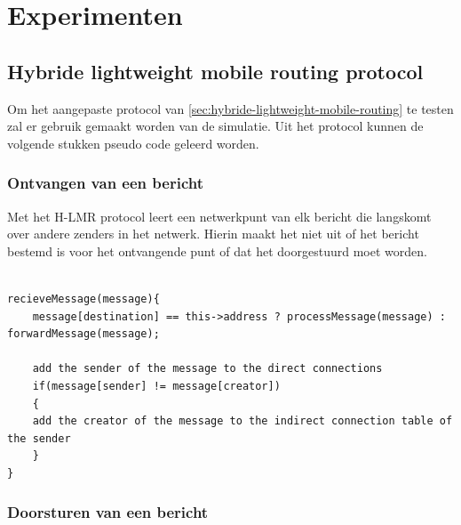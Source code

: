 \documentclass[a4paper, 11pt, oneside]{report}
\begin{document}
\chapter{Experimenten}
\label{experimenten}


\section[Hybride-LMR]{Hybride lightweight mobile routing protocol}

Om het aangepaste protocol van \autoref{sec:hybride-lightweight-mobile-routing} te testen zal er gebruik gemaakt worden van de simulatie.
Uit het protocol kunnen de volgende stukken pseudo code geleerd worden.

\subsection{Ontvangen van een bericht}

Met het H-LMR protocol leert een netwerkpunt van elk bericht die langskomt over andere zenders in het netwerk.
Hierin maakt het niet uit of het bericht bestemd is voor het ontvangende punt of dat het doorgestuurd moet worden. 

\begin{lstlisting}

recieveMessage(message){
	message[destination] == this->address ? processMessage(message) : forwardMessage(message);
	
	add the sender of the message to the direct connections
	if(message[sender] != message[creator])
	{
	add the creator of the message to the indirect connection table of the sender
	}
}

\end{lstlisting}

\subsection{Doorsturen van een bericht}
\end{document}
